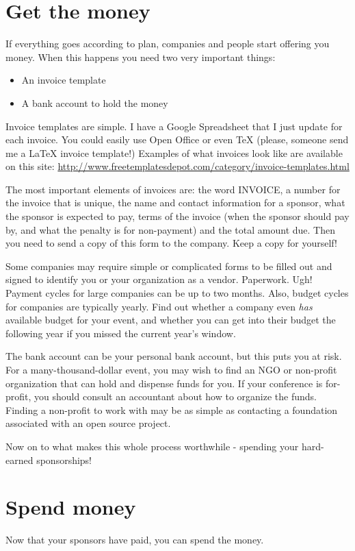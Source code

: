 \section*{Get the money}
If everything goes according to plan, companies and people start offering you money. When this happens you need two very important things: 
\begin{itemize}
\item An invoice template
\item A bank account to hold the money
\end{itemize}

Invoice templates are simple. I have a Google Spreadsheet that I just update for each invoice. You could easily use Open Office or even TeX (please, someone send me a LaTeX invoice template!) Examples of what invoices look like are available on this site: \url{http://www.freetemplatesdepot.com/category/invoice-templates.html}

The most important elements of invoices are: the word INVOICE, a number for the invoice that is unique, the name and contact information for a sponsor, what the sponsor is expected to pay, terms of the invoice (when the sponsor should pay by, and what the penalty is for non-payment) and the total amount due. Then you need to send a copy of this form to the company. Keep a copy for yourself!

Some companies may require simple or complicated forms to be filled out and signed to identify you or your organization as a vendor. Paperwork. Ugh! Payment cycles for large companies can be up to two months. Also, budget cycles for companies are typically yearly. Find out whether a company even \textit{has} available budget for your event, and whether you can get into their budget the following year if you missed the current year’s window.

The bank account can be your personal bank account, but this puts you at risk. For a many-thousand-dollar event, you may wish to find an NGO or non-profit organization that can hold and dispense funds for you. If your conference is for-profit, you should consult an accountant about how to organize the funds. Finding a non-profit to work with may be as simple as contacting a foundation associated with an open source project. 

Now on to what makes this whole process worthwhile - spending your hard-earned sponsorships!

\section*{Spend money}
Now that your sponsors have paid, you can spend the money. 

